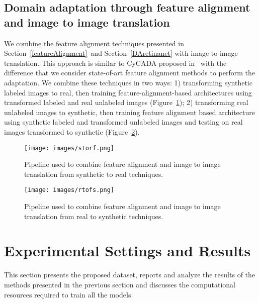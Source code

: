 \documentclass[preprint]{elsarticle}
\begin{document}
\subsection{Domain adaptation through feature alignment and image to image translation}
We combine the feature alignment techniques presented in Section~\ref{featureAlignment}~and Section~\ref{DAretinanet} with image-to-image translation. This approach is similar to CyCADA proposed in~\cite{hoffman2017cycada} with the difference that we consider state-of-art feature alignment methods to perform the adaptation. We combine these techniques in two ways: 1) transforming synthetic labeled images to real, then training feature-alignment-based architectures using transformed labeled and real unlabeled images (Figure~\ref{fig:storf}); 2) transforming real unlabeled images to synthetic, then training feature alignment based architecture using synthetic labeled and transformed unlabeled images and testing on real images transformed to synthetic (Figure~\ref{fig:rtosf}).
\begin{figure}[t]
            \centering
            \texttt{[image: images/storf.png]}
            \caption{Pipeline used to combine feature alignment and image to image translation from synthetic to real techniques.}
            \label{fig:storf}
\end{figure}
\begin{figure}[t]
            \centering
            \texttt{[image: images/rtofs.png]}
            \caption{Pipeline used to combine feature alignment and image to image translation from real to synthetic techniques.}
            \label{fig:rtosf}
\end{figure}
\section{Experimental Settings and Results}
This section presents the proposed dataset, reports and analyze the results of the methods presented in the previous section and discusses the computational resources required to train all the models.
\label{result}
\end{document}
